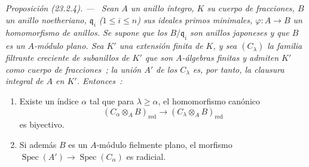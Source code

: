 \documentclass[10pt,oneside]{book}
\makeatletter
\newcommand{\setmanualcurrentlabel}[1]{\def\@currentlabel{#1}}
\newenvironment{proposition}[1][]{%
  \setmanualcurrentlabel{#1}\par\medskip\noindent\itshape Proposición (#1). ---\ }{\par}
\makeatother
\begin{document}
\begin{proposition}[23.2.4]
\label{0.23.2.4-es}
Sean $A$ un anillo íntegro, $K$ su cuerpo de fracciones, $B$ un anillo
noetheriano, $\mathfrak q_i$ ($1\leqslant i\leqslant n$) sus ideales primos
minimales, $\varphi:A\to B$ un homomorfismo de anillos. Se supone que los
$B/\mathfrak q_i$ son anillos japoneses y que $B$ es un $A$-módulo
plano. Sea $K'$ una extensión finita de $K$, y sea $(C_\lambda)$ la familia
filtrante creciente de subanillos de $K'$ que son $A$-álgebras
finitas y admiten $K'$ como cuerpo de fracciones~; la unión $A'$ de los
$C_\lambda$ es, por tanto, la clausura integral de $A$ en $K'$. Entonces~:
\begin{enumerate}
  \item[\textup{(i)}] Existe un índice $\alpha$ tal que para $\lambda\geqslant
  \alpha$, el homomorfismo canónico
  \begin{equation}
  \label{0.23.2.4.1-es}
    (C_\alpha\otimes_AB)_{\mathrm{red}}
    \longrightarrow(C_\lambda\otimes_AB)_{\mathrm{red}}
    \tag{23.2.4.1}
  \end{equation}
  es biyectivo.
  \item[\textup{(ii)}] Si además $B$ es un $A$-módulo fielmente plano, el morfismo
  $\operatorname{Spec}(A')\to\operatorname{Spec}(C_\alpha)$ es radicial.
\end{enumerate}
\end{proposition}
\end{document}
